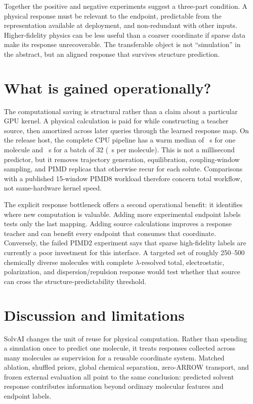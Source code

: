 \documentclass{article}
\begin{document}
Together the positive and negative experiments suggest a three-part condition. A
physical response must be relevant to the endpoint, predictable from the representation
available at deployment, and non-redundant with other inputs. Higher-fidelity physics
can be less useful than a coarser coordinate if sparse data make its response
unrecoverable. The transferable object is not ``simulation'' in the abstract, but an
aligned response that survives structure prediction.

\section{What is gained operationally?}

The computational saving is structural rather than a claim about a particular GPU
kernel. A physical calculation is paid for while constructing a teacher source, then
amortized across later queries through the learned response map. On the release host,
the complete CPU pipeline has a warm median of \WarmSingleSeconds{}~s for one
molecule and \BatchSeconds{}~s for a batch of 32
(\BatchPerMoleculeSeconds{}~s per molecule). This is not a millisecond predictor, but
it removes trajectory generation, equilibration, coupling-window sampling, and PIMD
replicas that otherwise recur for each solute. Comparisons with a published 15-window
PIMD8 workload therefore concern total workflow, not same-hardware kernel speed.

The explicit response bottleneck offers a second operational benefit: it identifies
where new computation is valuable. Adding more experimental endpoint labels tests
only the last mapping. Adding source calculations improves a response teacher and can
benefit every endpoint that consumes that coordinate. Conversely, the failed PIMD2
experiment says that sparse high-fidelity labels are currently a poor investment for
this interface. A targeted set of roughly 250--500 chemically diverse molecules with
complete $\lambda$-resolved total, electrostatic, polarization, and
dispersion/repulsion response would test whether that source can cross the
structure-predictability threshold.

\section{Discussion and limitations}

SolvAI changes the unit of reuse for physical computation. Rather than spending a
simulation once to predict one molecule, it treats responses collected across many
molecules as supervision for a reusable coordinate system. Matched ablation, shuffled
priors, global chemical separation, zero-ARROW transport, and frozen external
evaluation all point to the same conclusion: predicted solvent response contributes
information beyond ordinary molecular features and endpoint labels.
\end{document}
